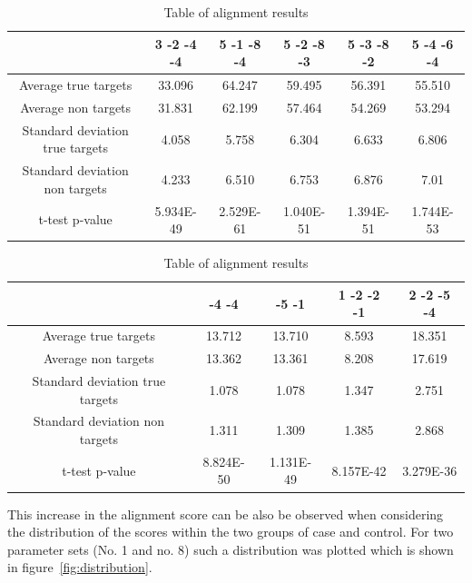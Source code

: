 \documentclass[12pt]{article}
\begin{document}
\begin{table}
\footnotesize
\caption{Table of alignment results}
\vspace{0.3cm}
\begin{tabular}{c|c|c|c|c|c}
& 3 -2 -4 -4 & 5 -1 -8 -4 & 5 -2 -8 -3 & 5 -3 -8 -2 & 5 -4 -6 -4 \\
\hline\hline
Average true targets & 33.096 & 64.247 & 59.495	& 56.391 & 55.510\\
Average	non targets & 31.831 & 62.199 & 57.464 & 54.269 & 53.294 \\
\hline
Standard deviation true targets & 4.058	& 5.758 & 6.304	& 6.633 & 6.806\\
Standard deviation non targets & 4.233 & 6.510 & 6.753 & 6.876 & 7.01\\
\hline
t-test p-value & 5.934E-49 & 2.529E-61 & 1.040E-51 & 1.394E-51 & 1.744E-53 \\\hline
\end{tabular}\vspace{0.5cm}


\begin{tabular}{c|c|c|c|c}
& -4 -4 & -5 -1 & 1 -2 -2 -1 & 2 -2 -5 -4  \\
\hline\hline
Average true targets & 13.712 & 13.710 & 8.593 & 18.351\\
Average	non targets & 13.362 & 13.361 &	8.208 &	17.619 \\
\hline
Standard deviation true targets & 1.078	& 1.078	& 1.347	& 2.751\\
Standard deviation non targets & 1.311 & 1.309 & 1.385 & 2.868\\
\hline
t-test p-value & 8.824E-50 & 1.131E-49 & 8.157E-42 & 3.279E-36 \\
\hline
\end{tabular}
\label{table:results}
\end{table}

This increase in the alignment score can be also be observed when considering the distribution of the scores within the two groups of case and control. For two parameter sets (No. 1 and no. 8) such a distribution was plotted which is shown in figure~\ref{fig:distribution}. 
\end{document}
